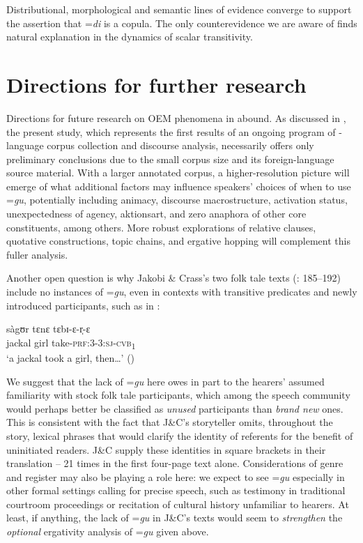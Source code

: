 \documentclass[output=paper,modfonts]{langscibook}
\begin{document}
Distributional, morphological and semantic lines of evidence converge to support the assertion that =\textit{di} is a copula. The only counterevidence we are aware of finds natural explanation in the dynamics of scalar transitivity.


\section{Directions for further research}\label{sec:wolfe:5}
Directions for future research on OEM phenomena in  abound. As discussed in , the present study, which represents the first results of an ongoing program of -language corpus collection and discourse analysis, necessarily offers only preliminary conclusions due to the small corpus size and its foreign-language source material. With a larger annotated corpus, a higher-resolution picture will emerge of what additional factors may influence speakers’ choices of when to use =\textit{gu}, potentially including animacy, discourse macrostructure, activation status, unexpectedness of agency, aktionsart, and zero anaphora of other core constituents, among others. More robust explorations of relative clauses, quotative constructions, topic chains, and ergative hopping will complement this fuller analysis.

Another open question is why Jakobi \& Crass’s two folk tale texts (\citeyear{JakobiCrass2004}: 185--192) include no instances of =\textit{gu}, even in contexts with transitive predicates and newly introduced participants, such as in :


\ea\label{ex:wolfe:26}
\gll sàgʊr tɛnɛ tɛbɪ-ɛ-r̩-ɛ\\
     jackal girl take-\textsc{prf}\textsc{:3-3:}\textsc{sj}-\textsc{cvb}\textsc{\textsubscript{1}}\\
\glt ‘a jackal took a girl, then…’ (\citealt[185]{JakobiCrass2004})
\z

We suggest that the lack of =\textit{gu} here owes in part to the hearers’ assumed familiarity with stock folk tale participants, which among the  speech community would perhaps better be classified as \textit{unused} participants than \textit{brand new} ones. This is consistent with the fact that J\&C’s storyteller omits, throughout the story, lexical  phrases that would clarify the identity of referents for the benefit of uninitiated readers. J\&C supply these identities in square brackets in their  translation – 21 times in the first four-page text alone. Considerations of genre and register may also be playing a role here: we expect to see =\textit{gu} especially in other formal settings calling for precise speech, such as testimony in traditional courtroom proceedings or recitation of cultural history unfamiliar to hearers. At least, if anything, the lack of =\textit{gu} in J\&C’s texts would seem to \textit{strengthen} the \textit{optional} ergativity analysis of =\textit{gu} given above.
\end{document}

